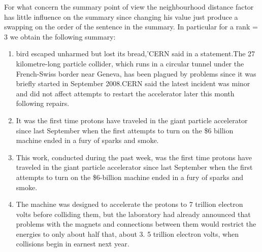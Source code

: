 For what concern the summary point of view the neighbourhood distance factor has little influence on the summary since changing his value just produce a swapping on the order of the sentence in the summary.
In particular for a rank = 3 we obtain the following summary:
\begin{enumerate}
	\item bird escaped unharmed but lost its bread,'CERN said in a statement.The 27 kilometre-long particle collider, which runs in a circular tunnel under the French-Swiss border near Geneva, has been plagued by problems since it was briefly started in September 2008.CERN said the latest incident was minor and did not affect attempts to restart the accelerator later this month following repairs.
	
	\item It was the first time protons have traveled in the giant particle accelerator since last September when the first attempts to turn on the \$6 billion machine ended in a fury of sparks and smoke.
	
	\item This work, conducted during the past week, was the first time protons have traveled in the giant particle accelerator since last September when the first attempts to turn on the \$6-billion machine ended in a fury of sparks and smoke.
	
	\item The machine was designed to accelerate the protons to 7 trillion electron volts before colliding them, but the laboratory had already announced that problems with the magnets and connections between them would restrict the energies to only about half that, about 3.  5 trillion electron volts, when collisions begin in earnest next year.
\end{enumerate}


